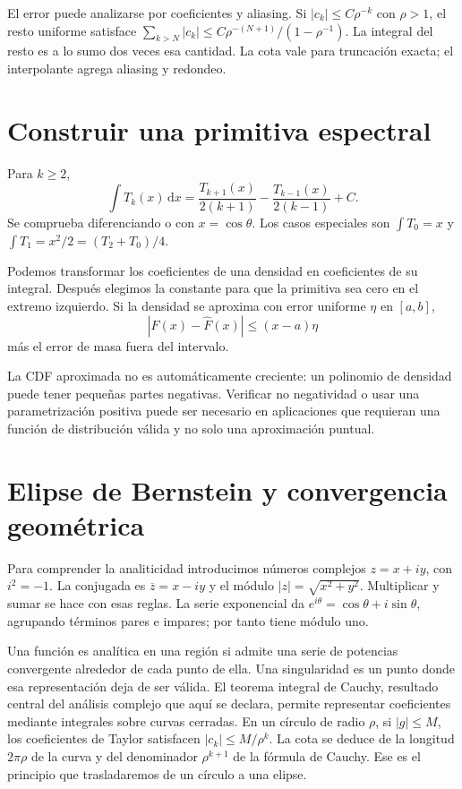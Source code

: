 \documentclass[11pt,a4paper]{article}
\newcommand{\dd}{\,\mathrm d}
\theoremstyle{definition}
\begin{document}
El error puede analizarse por coeficientes y aliasing. Si $|c_k|\le C\rho^{-k}$ con $\rho>1$, el resto uniforme satisface
$\sum_{k>N}|c_k|\le C\rho^{-(N+1)}/(1-\rho^{-1})$. La integral del resto es a lo sumo dos veces esa cantidad. La cota vale para truncación exacta; el interpolante agrega aliasing y redondeo.

\section{Construir una primitiva espectral}
Para $k\ge2$,
\[
\int T_k(x)\dd x=
\frac{T_{k+1}(x)}{2(k+1)}-\frac{T_{k-1}(x)}{2(k-1)}+C.
\]
Se comprueba diferenciando o con $x=\cos\theta$. Los casos especiales son
$\int T_0=x$ y $\int T_1=x^2/2=(T_2+T_0)/4$.

Podemos transformar los coeficientes de una densidad en coeficientes de su integral. Después elegimos la constante para que la primitiva sea cero en el extremo izquierdo. Si la densidad se aproxima con error uniforme $\eta$ en $[a,b]$,
\[
|F(x)-\widehat F(x)|\le(x-a)\eta
\]
más el error de masa fuera del intervalo.

La CDF aproximada no es automáticamente creciente: un polinomio de densidad puede tener pequeñas partes negativas. Verificar no negatividad o usar una parametrización positiva puede ser necesario en aplicaciones que requieran una función de distribución válida y no solo una aproximación puntual.

\section{Elipse de Bernstein y convergencia geométrica}

Para comprender la analiticidad introducimos números complejos $z=x+iy$, con $i^2=-1$. La conjugada es $\overline z=x-iy$ y el módulo $|z|=\sqrt{x^2+y^2}$. Multiplicar y sumar se hace con esas reglas. La serie exponencial da
$e^{i\theta}=\cos\theta+i\sin\theta$, agrupando términos pares e impares; por tanto tiene módulo uno.

Una función es analítica en una región si admite una serie de potencias convergente alrededor de cada punto de ella. Una singularidad es un punto donde esa representación deja de ser válida. El teorema integral de Cauchy, resultado central del análisis complejo que aquí se declara, permite representar coeficientes mediante integrales sobre curvas cerradas. En un círculo de radio $\rho$, si $|g|\le M$, los coeficientes de Taylor satisfacen $|c_k|\le M/\rho^k$. La cota se deduce de la longitud $2\pi\rho$ de la curva y del denominador $\rho^{k+1}$ de la fórmula de Cauchy. Ese es el principio que trasladaremos de un círculo a una elipse.
\end{document}
